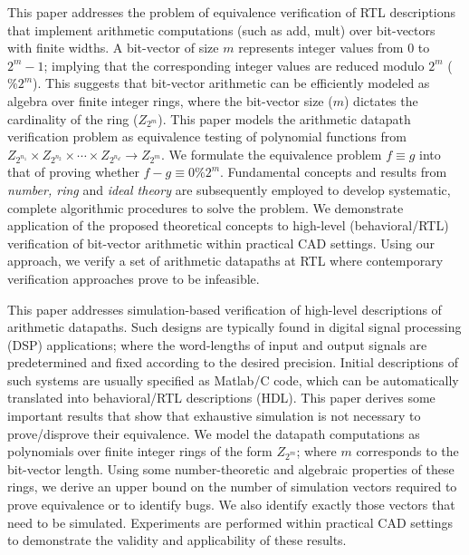 This paper addresses the problem of equivalence verification of RTL
descriptions that implement arithmetic computations (such as {\sc add,
mult}) over bit-vectors with finite widths. A bit-vector of size $m$
represents integer values from $0$ to $2^m -1$; implying that the
corresponding integer values are reduced modulo $2^m$ ($\% 2^m$). This
suggests that bit-vector arithmetic can be efficiently modeled as
algebra over finite integer rings, where the bit-vector size ($m$)
dictates the cardinality of the ring ($Z_{2^m}$). This paper models the
arithmetic datapath verification problem as equivalence testing of
polynomial functions from $Z_{2^{n_1}} \times Z_{2^{n_2}} \times
\cdots \times Z_{2^{n_d}} \rightarrow Z_{2^m}$. We formulate the
equivalence problem $f \equiv g$ into that of proving whether $f-g
\equiv 0 \% 2^m$. Fundamental concepts and results from {\it number,
ring} and {\it ideal theory} are subsequently employed to develop
systematic, complete algorithmic procedures to solve the problem. We
demonstrate application of the proposed theoretical concepts to
high-level (behavioral/RTL) verification of bit-vector arithmetic
within practical CAD settings. Using our approach, we verify a set of
arithmetic datapaths at RTL where contemporary verification approaches
prove to be infeasible.

This paper addresses simulation-based verification of high-level
descriptions of arithmetic datapaths. Such designs are typically found
in digital signal processing (DSP) applications; where the
word-lengths of input and output signals are predetermined and fixed
according to the desired precision. Initial descriptions of such
systems are usually specified as Matlab/C code, which can be
automatically translated into behavioral/RTL descriptions (HDL). This
paper derives some important results that show that exhaustive
simulation is not necessary to prove/disprove their equivalence.  We
model the datapath computations as polynomials over finite integer
rings of the form $Z_{2^m}$; where $m$ corresponds to the bit-vector
length. Using some number-theoretic and algebraic properties of these
rings, we derive an upper bound on the number of simulation vectors
required to prove equivalence or to identify bugs. We also identify
exactly those vectors that need to be simulated. Experiments are
performed within practical CAD settings to demonstrate the validity
and applicability of these results.

